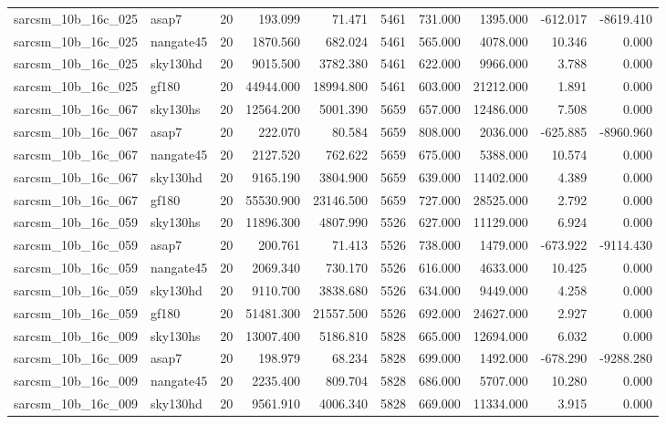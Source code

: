 \documentclass{article}
\begin{document}
\begin{longtable}{llrrrrrrrr}
sarcsm\_10b\_16c\_025 & asap7 & 20 & 193.099 & 71.471 & 5461 & 731.000 & 1395.000 & -612.017 & -8619.410 \\
sarcsm\_10b\_16c\_025 & nangate45 & 20 & 1870.560 & 682.024 & 5461 & 565.000 & 4078.000 & 10.346 & 0.000 \\
sarcsm\_10b\_16c\_025 & sky130hd & 20 & 9015.500 & 3782.380 & 5461 & 622.000 & 9966.000 & 3.788 & 0.000 \\
sarcsm\_10b\_16c\_025 & gf180 & 20 & 44944.000 & 18994.800 & 5461 & 603.000 & 21212.000 & 1.891 & 0.000 \\
sarcsm\_10b\_16c\_067 & sky130hs & 20 & 12564.200 & 5001.390 & 5659 & 657.000 & 12486.000 & 7.508 & 0.000 \\
sarcsm\_10b\_16c\_067 & asap7 & 20 & 222.070 & 80.584 & 5659 & 808.000 & 2036.000 & -625.885 & -8960.960 \\
sarcsm\_10b\_16c\_067 & nangate45 & 20 & 2127.520 & 762.622 & 5659 & 675.000 & 5388.000 & 10.574 & 0.000 \\
sarcsm\_10b\_16c\_067 & sky130hd & 20 & 9165.190 & 3804.900 & 5659 & 639.000 & 11402.000 & 4.389 & 0.000 \\
sarcsm\_10b\_16c\_067 & gf180 & 20 & 55530.900 & 23146.500 & 5659 & 727.000 & 28525.000 & 2.792 & 0.000 \\
sarcsm\_10b\_16c\_059 & sky130hs & 20 & 11896.300 & 4807.990 & 5526 & 627.000 & 11129.000 & 6.924 & 0.000 \\
sarcsm\_10b\_16c\_059 & asap7 & 20 & 200.761 & 71.413 & 5526 & 738.000 & 1479.000 & -673.922 & -9114.430 \\
sarcsm\_10b\_16c\_059 & nangate45 & 20 & 2069.340 & 730.170 & 5526 & 616.000 & 4633.000 & 10.425 & 0.000 \\
sarcsm\_10b\_16c\_059 & sky130hd & 20 & 9110.700 & 3838.680 & 5526 & 634.000 & 9449.000 & 4.258 & 0.000 \\
sarcsm\_10b\_16c\_059 & gf180 & 20 & 51481.300 & 21557.500 & 5526 & 692.000 & 24627.000 & 2.927 & 0.000 \\
sarcsm\_10b\_16c\_009 & sky130hs & 20 & 13007.400 & 5186.810 & 5828 & 665.000 & 12694.000 & 6.032 & 0.000 \\
sarcsm\_10b\_16c\_009 & asap7 & 20 & 198.979 & 68.234 & 5828 & 699.000 & 1492.000 & -678.290 & -9288.280 \\
sarcsm\_10b\_16c\_009 & nangate45 & 20 & 2235.400 & 809.704 & 5828 & 686.000 & 5707.000 & 10.280 & 0.000 \\
sarcsm\_10b\_16c\_009 & sky130hd & 20 & 9561.910 & 4006.340 & 5828 & 669.000 & 11334.000 & 3.915 & 0.000 \\

\end{longtable}
\end{document}

